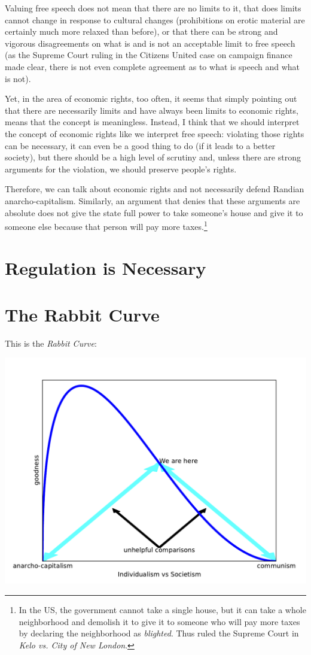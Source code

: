 Valuing free speech does not mean that there are no limits to it, that does
limits cannot change in response to cultural changes (prohibitions on erotic
material are certainly much more relaxed than before), or that there can be
strong and vigorous disagreements on what is and is not an acceptable limit to
free speech (as the Supreme Court ruling in the Citizens United case on
campaign finance made clear, there is not even complete agreement as to what is
speech and what is not).

Yet, in the area of economic rights, too often, it seems that simply pointing
out that there are necessarily limits and have always been limits to economic
rights, means that the concept is meaningless. Instead, I think that we should
interpret the concept of economic rights like we interpret free speech:
violating those rights can be necessary, it can even be a good thing to do (if
it leads to a better society), but there should be a high level of scrutiny
and, unless there are strong arguments for the violation, we should preserve
people's rights.

Therefore, we can talk about economic rights and not necessarily defend Randian
anarcho-capitalism. Similarly, an argument that denies that these arguments are
absolute does not give the state full power to take someone's house and give it
to someone else because that person will pay more taxes.\footnote{In the US,
the government cannot take a single house, but it can take a whole neighborhood
and demolish it to give it to someone who will pay more taxes by declaring the
neighborhood as \emph{blighted}. Thus ruled the Supreme Court in \emph{Kelo vs.
City of New London}.}

\section{Regulation is Necessary}


\section{The Rabbit Curve}

This is the \emph{Rabbit Curve}:

\includegraphics[width=.8\textwidth]{images/rabbit-curve.pdf}

